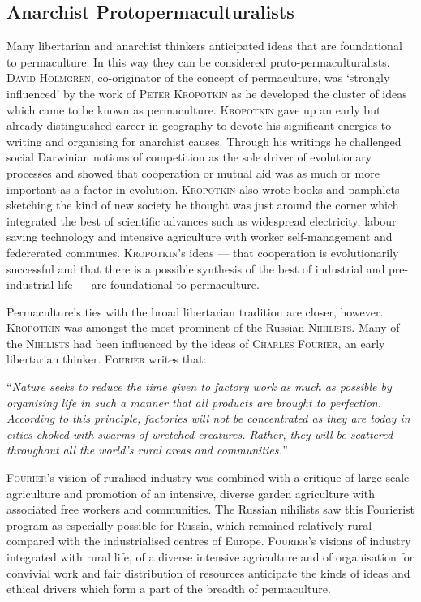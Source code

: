 \documentclass[a4paper, 11pt]{article}
\begin{document}
\begin{multicols*}{2}
\section*{Anarchist Protopermaculturalists}
 Many libertarian and anarchist thinkers anticipated ideas that are foundational to permaculture. In this way they can be considered proto-permaculturalists. \textsc{David Holmgren}, co-originator of the concept of permaculture, was `strongly influenced' by the work of \textsc{Peter Kropotkin} as he developed the cluster of ideas which came to be known as permaculture.  \textsc{Kropotkin} gave up an early but already distinguished career in geography to devote his significant energies to writing and organising for anarchist causes. Through his writings he challenged social Darwinian notions of competition as the sole driver of evolutionary processes and showed that cooperation or mutual aid was as much or more important as a factor in evolution.  \textsc{Kropotkin} also wrote books and pamphlets sketching the kind of new society he thought was just around the corner which integrated the best of scientific advances such as widespread electricity, labour saving technology and intensive agriculture with worker self-management and federerated communes.  \textsc{Kropotkin}'s ideas --- that cooperation is evolutionarily successful and that there is a possible synthesis of the best of industrial and pre-industrial life --- are foundational to permaculture.

  Permaculture's ties with the broad libertarian tradition are closer, however.  \textsc{Kropotkin} was amongst the most prominent of the Russian \textsc{Nihilists}. Many of the \textsc{Nihilists} had been influenced by the ideas of \textsc{Charles Fourier}, an early libertarian thinker. \textsc{Fourier} writes that: 

\vspace{1mm}
``\em{Nature seeks to reduce the time given to factory work as much as possible by organising life in such a manner that all products are brought to perfection.  According to this principle, factories will not be concentrated as they are today in cities choked with swarms of wretched creatures.  Rather, they will be scattered throughout all the world's rural areas and communities.}\em''
\vspace{1mm}

\textsc{Fourier}'s vision of ruralised industry was combined with a critique of large-scale agriculture and promotion of an intensive, diverse garden agriculture with associated free workers and communities.  The Russian nihilists saw this Fourierist program as especially possible for Russia, which remained relatively rural compared with the industrialised centres of Europe.  \textsc{Fourier}'s visions of industry integrated with rural life, of a diverse intensive agriculture and of organisation for convivial work and fair distribution of resources anticipate the kinds of ideas and ethical drivers which form a part of the breadth of permaculture.


\end{multicols*}
\end{document}
